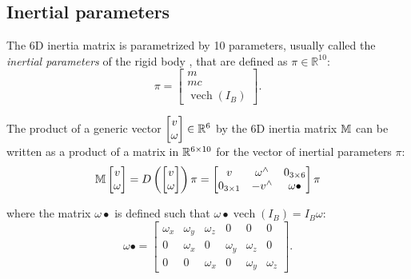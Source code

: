 \subsection{Inertial parameters}
The 6D inertia matrix is parametrized by 10 parameters, usually called the \emph{inertial parameters} of the rigid body \citep{handbookident}, that are defined as $\pi \in \mathbb{R}^{10}$:
\begin{equation}
\label{eq:inertialParametersVector}
    \pi = 
    \begin{bmatrix}
    m \\
    m c \\
    \operatorname{vech}(I_B)
    \end{bmatrix} .
\end{equation}

The product of a generic vector $\begin{bmatrix} v \\ \omega \end{bmatrix} \in \mathbb{R}^6$ by the 6D inertia matrix $\mathbb{M}$ can be written as a product of a matrix in $\mathbb{R}^{6 \times 10}$ for the vector of inertial parameters $\pi$:
\begin{equation}
  \mathbb{M} \begin{bmatrix} v \\ \omega \end{bmatrix} 
  =
  D\left(\begin{bmatrix} v \\ \omega \end{bmatrix}\right)
  \pi
  =
\begin{bmatrix}
v            & \omega^\wedge & 0_{3 \times 6} \\
0_{3\times1} & -v^\wedge     & \omega \bullet 
\end{bmatrix} \pi
\end{equation}

where the matrix $\omega \bullet$ is defined such that $\omega \bullet \operatorname{vech}({I_B}) = {I_B} \omega$:
\begin{equation}
\omega \bullet = \begin{bmatrix} \omega_x & \omega_y & \omega_z & 0 & 0 & 0 \\ 
                                    0 & \omega_x & 0 & \omega_y & \omega_z & 0 \\ 
                                    0 & 0 & \omega_x & 0 & \omega_y & \omega_z \end{bmatrix}.
\end{equation}

